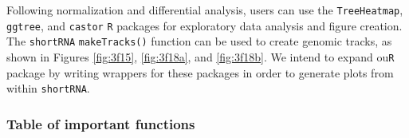 \documentclass[12pt,twoside]{reedthesis}
\begin{document}
Following normalization and differential analysis, users can use the
\texttt{TreeHeatmap}, \texttt{ggtree}, and \texttt{castor} \texttt{R} packages for exploratory data
analysis and figure creation. The \texttt{shortRNA} \texttt{makeTracks()} function can
be used to create genomic tracks, as shown in Figures \ref{fig:3f15},
\ref{fig:3f18a}, and \ref{fig:3f18b}. We intend to expand ou\texttt{R} package
by writing wrappers for these packages in order to generate plots from
within \texttt{shortRNA}.

\hypertarget{table-of-important-functions}{%
\subsubsection{Table of important functions}\label{table-of-important-functions}}
\end{document}
